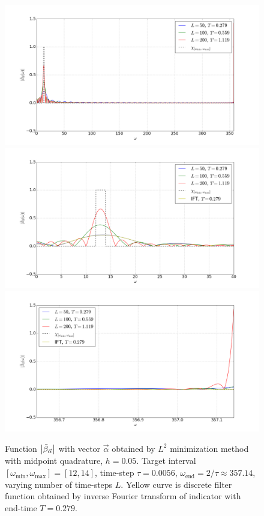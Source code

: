 \documentclass[a4paper,11pt,bibliography=totoc,listof=totoc,headinclude=true,cleardoublepage=empty,oneside]{scrbook}
\newcommand{\dffv}{\Tilde{\beta}_{\Vec{\alpha}}}
\newcommand{\e}{\mathrm{end}}
\begin{document}
\begin{figure}
    \centering
    \includegraphics[width=0.75\linewidth]{latex//images//l2_minim/Figure_1.png}
    \includegraphics[width=0.75\linewidth]{latex//images//l2_minim/Figure_2.png}
    \includegraphics[width=0.75\linewidth]{latex//images//l2_minim/Figure_3.png}
    \caption{Function $\left|\dffv\right|$ with vector $\Vec{\alpha}$ obtained by $L^2$ minimization method with midpoint quadrature, $h=0.05$. Target interval $\left[\omega_{\min}, \omega_{\max} \right] = [12, 14]$, time-step $\tau = 0.0056$, $\omega_\e = 2/\tau \approx 357.14$, varying number of time-steps $L$. Yellow curve is discrete filter function obtained by inverse Fourier transform of indicator with end-time $T = 0.279$.}
    \label{fig:l2 ex1}
\end{figure}
\end{document}

